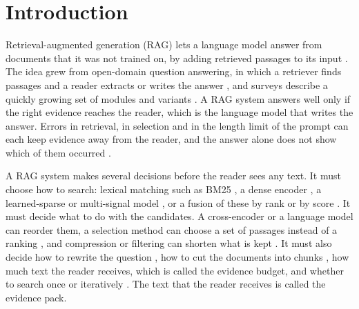 \section{Introduction}
\label{sec:intro}
Retrieval-augmented generation (RAG) lets a language model answer from documents that it was not trained on, by adding retrieved passages to its input \citep{lewis2020rag,guu2020realm,ram2023incontext}. The idea grew from open-domain question answering, in which a retriever finds passages and a reader extracts or writes the answer \citep{chen2017drqa,karpukhin2020dpr}, and surveys describe a quickly growing set of modules and variants \citep{gao2023ragsurvey}. A RAG system answers well only if the right evidence reaches the reader, which is the language model that writes the answer. Errors in retrieval, in selection and in the length limit of the prompt can each keep evidence away from the reader, and the answer alone does not show which of them occurred \citep{ru2024ragchecker,joren2025sufficient}.

A RAG system makes several decisions before the reader sees any text. It must choose how to search: lexical matching such as BM25 \citep{robertson2009bm25}, a dense encoder \citep{karpukhin2020dpr}, a learned-sparse or multi-signal model \citep{formal2021spladev2,chen2024bgem3}, or a fusion of these by rank or by score \citep{cormack2009rrf,bruch2023fusion}. It must decide what to do with the candidates. A cross-encoder \citep{nogueira2019monobert} or a language model \citep{sun2023rankgpt,zhuang2024setwise} can reorder them, a selection method can choose a set of passages instead of a ranking \citep{lee2025setr}, and compression or filtering can shorten what is kept \citep{xu2024recomp,jiang2024longllmlingua}. It must also decide how to rewrite the question \citep{gao2023hyde,rackauckas2024ragfusion}, how to cut the documents into chunks \citep{chen2024densex,gunther2024latechunking}, how much text the reader receives, which is called the evidence budget, and whether to search once or iteratively \citep{trivedi2023ircot,asai2024selfrag,jin2025searchr1}. The text that the reader receives is called the evidence pack.

